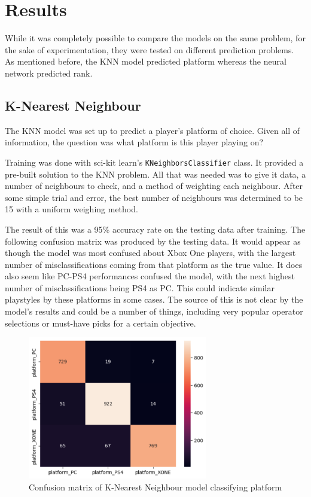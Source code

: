 \documentclass[12pt]{article}
\begin{document}
\section{Results}
While it was completely possible to compare the models on the same problem, for the sake of experimentation, they were tested on different prediction problems.
As mentioned before, the KNN model predicted platform whereas the neural network predicted rank.

\subsection{K-Nearest Neighbour}
The KNN model was set up to predict a player's platform of choice.
Given all of information, the question was what platform is this player playing on?

Training was done with sci-kit learn's \verb`KNeighborsClassifier` class.
It provided a pre-built solution to the KNN problem.
All that was needed was to give it data, a number of neighbours to check, and a method of weighting each neighbour.
After some simple trial and error, the best number of neighbours was determined to be 15 with a uniform weighing method.

The result of this was a 95\% accuracy rate on the testing data after training.
The following confusion matrix was produced by the testing data.
It would appear as though the model was most confused about Xbox One players, with the largest number of misclassifications coming from that platform as the true value.
It does also seem like PC-PS4 performances confused the model, with the next highest number of misclassifications being PS4 as PC.
This could indicate similar playstyles by these platforms in some cases.
The source of this is not clear by the model's results and could be a number of things, including very popular operator selections or must-have picks for a certain objective.
\begin{figure}[H]
	\centering
	\includegraphics[width=0.7\textwidth]{knn-confusion-matrix}
	\caption{Confusion matrix of K-Nearest Neighbour model classifying platform}
	\label{fig:knn-confusion-matrix}
\end{figure}
\end{document}
